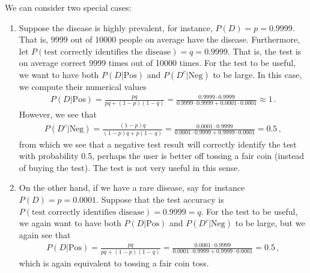 \begin{ex}
We can consider two special cases:
\begin{enumerate}
\item Suppose the disease is highly prevalent, for instance, $P(D) = p = 0.9999$. That is, 9999 out of 10000 people on average have the disease. Furthermore, let $P(\text{test correctly identifies the disease})= q = 0.9999$. That is, the test is on average correct 9999 times out of 10000 times. For the test to be useful, we want to have both $P(D|\text{Pos})$ and $P(D^c|\text{Neg})$ to be large. In this case, we compute their numerical values
\begin{align*}
P(D|\text{Pos}) = \frac{pq}{pq+(1-p)(1-q)}  = \frac{0.9999 \cdot 0.9999}{0.9999\cdot 0.9999 + 0.0001 \cdot 0.0001}\approx 1\,.
\end{align*}
However, we see that
\begin{align*}
P(D^c|\text{Neg}) = \frac{(1-p)q}{(1-p)q+p(1-q)} = \frac{0.0001 \cdot 0.9999}{0.0001\cdot 0.9999 + 0.9999\cdot 0.0001} = 0.5\,,
\end{align*}
from which we see that a negative test result will correctly identify the test with probability 0.5, perhaps the user is better off tossing a fair coin (instead of buying the test). The test is not very useful in this sense. 

\item On the other hand, if we have a rare disease, say for instance $P(D) = p = 0.0001$. Suppose that the test accuracy is  $P(\text{test correctly identifies disease}) = 0.9999=q$. For the test to be useful, we again want to have both $P(D|\text{Pos})$ and $P(D^c|\text{Neg})$ to be large, but we again see that 
\begin{align*}
P(D|\text{Pos}) = \frac{pq}{pq+(1-p)(1-q)} = \frac{0.0001\cdot 0.9999}{0.0001 \cdot 0.9999 + 0.9999 \cdot 0.0001} = 0.5\,,
\end{align*}
which is again equivalent to tossing a fair coin toss. 
\end{enumerate}


\end{ex}




